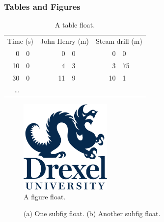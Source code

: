 \subsubsection{Tables and Figures}
\Blindtext[2]
\begin{table}
  \begin{center}
  \begin{tabular}{r@{.}l r@{.}l r@{.}l}
    \multicolumn{2}{c}{Time (s)} &
      \multicolumn{2}{c}{John Henry (m)} &
      \multicolumn{2}{c}{Steam drill (m)} \\
    0&0 & 0&0 & 0&0 \\
    10&0 & 4&3 & 3&75 \\
    30&0 & 11&9 & 10&1 \\
    \ldots
  \end{tabular}
  \caption{A table float.} %
  \end{center}
\end{table}
\Blindtext[2]
\begin{figure}
  \caption{A figure float. \blindtext} %
  \begin{center}
    \includegraphics[width=0.4\textwidth]{drexel-logo}
  \end{center}
\end{figure}
\Blindtext[3]
\begin{figure}
  \begin{center}
    \caption{(a) One subfig float. (b) Another subfig float.%
      \label{fig:both}}
  \end{center}
\end{figure}
